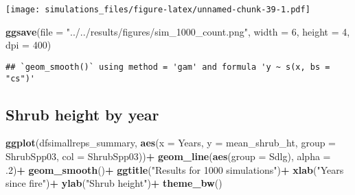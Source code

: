 \documentclass[]{article}
\newenvironment{Shaded}{\begin{snugshade}}{\end{snugshade}}
\newcommand{\KeywordTok}[1]{\textcolor[rgb]{0.13,0.29,0.53}{\textbf{#1}}}
\newcommand{\DataTypeTok}[1]{\textcolor[rgb]{0.13,0.29,0.53}{#1}}
\newcommand{\DecValTok}[1]{\textcolor[rgb]{0.00,0.00,0.81}{#1}}
\newcommand{\StringTok}[1]{\textcolor[rgb]{0.31,0.60,0.02}{#1}}
\newcommand{\OperatorTok}[1]{\textcolor[rgb]{0.81,0.36,0.00}{\textbf{#1}}}
\newcommand{\NormalTok}[1]{#1}
\begin{document}
\texttt{[image: simulations\_files/figure-latex/unnamed-chunk-39-1.pdf]}

\begin{Shaded}
\begin{Highlighting}[]
\KeywordTok{ggsave}\NormalTok{(}\DataTypeTok{file =} \StringTok{"../../results/figures/sim_1000_count.png"}\NormalTok{, }\DataTypeTok{width =} \DecValTok{6}\NormalTok{, }\DataTypeTok{height =} \DecValTok{4}\NormalTok{, }\DataTypeTok{dpi =} \DecValTok{400}\NormalTok{)}
\end{Highlighting}
\end{Shaded}

\begin{verbatim}
## `geom_smooth()` using method = 'gam' and formula 'y ~ s(x, bs = "cs")'
\end{verbatim}

\subsection{Shrub height by year}\label{shrub-height-by-year}

\begin{Shaded}
\end{Shaded}

\begin{Shaded}
\begin{Highlighting}[]
\KeywordTok{ggplot}\NormalTok{(dfsimallreps_summary, }\KeywordTok{aes}\NormalTok{(}\DataTypeTok{x =}\NormalTok{ Years, }\DataTypeTok{y =}\NormalTok{ mean_shrub_ht, }\DataTypeTok{group =}\NormalTok{ ShrubSpp03, }\DataTypeTok{col =}\NormalTok{ ShrubSpp03))}\OperatorTok{+}
\StringTok{  }\KeywordTok{geom_line}\NormalTok{(}\KeywordTok{aes}\NormalTok{(}\DataTypeTok{group =}\NormalTok{ Sdlg), }\DataTypeTok{alpha =}\NormalTok{ .}\DecValTok{2}\NormalTok{)}\OperatorTok{+}
\StringTok{  }\KeywordTok{geom_smooth}\NormalTok{()}\OperatorTok{+}
\StringTok{  }\KeywordTok{ggtitle}\NormalTok{(}\StringTok{"Results for 1000 simulations"}\NormalTok{)}\OperatorTok{+}
\StringTok{  }\KeywordTok{xlab}\NormalTok{(}\StringTok{"Years since fire"}\NormalTok{)}\OperatorTok{+}
\StringTok{  }\KeywordTok{ylab}\NormalTok{(}\StringTok{"Shrub height"}\NormalTok{)}\OperatorTok{+}
\StringTok{  }\KeywordTok{theme_bw}\NormalTok{()}
\end{Highlighting}
\end{Shaded}
\end{document}
